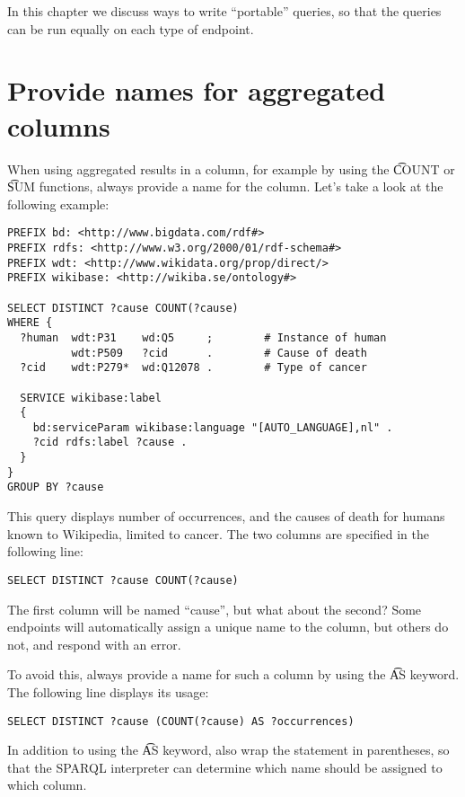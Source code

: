   In this chapter we discuss ways to write ``portable'' queries, so that
  the queries can be run equally on each type of endpoint.

\section{Provide names for aggregated columns}

  When using aggregated results in a column, for example by using the
  \t{COUNT} or \t{SUM} functions, always provide a name for
  the column.  Let's take a look at the following example:

\begin{lstlisting}[language=SPARQL]
PREFIX bd: <http://www.bigdata.com/rdf#>
PREFIX rdfs: <http://www.w3.org/2000/01/rdf-schema#>
PREFIX wdt: <http://www.wikidata.org/prop/direct/>
PREFIX wikibase: <http://wikiba.se/ontology#>

SELECT DISTINCT ?cause COUNT(?cause)
WHERE {
  ?human  wdt:P31    wd:Q5     ;        # Instance of human
          wdt:P509   ?cid      .        # Cause of death
  ?cid    wdt:P279*  wd:Q12078 .        # Type of cancer

  SERVICE wikibase:label
  {
    bd:serviceParam wikibase:language "[AUTO_LANGUAGE],nl" .
    ?cid rdfs:label ?cause .
  }
}
GROUP BY ?cause
\end{lstlisting}

  This query displays number of occurrences, and the causes of
  death for humans known to Wikipedia, limited to cancer.  The two
  columns are specified in the following line:

\begin{lstlisting}[language=SPARQL]
SELECT DISTINCT ?cause COUNT(?cause)
\end{lstlisting}

  The first column will be named ``cause'', but what about the second?
  Some endpoints will automatically assign a unique name to the column,
  but others do not, and respond with an error.

  To avoid this, always provide a name for such a column by using the
  \t{AS} keyword.  The following line displays its usage:

\begin{lstlisting}[language=SPARQL]
SELECT DISTINCT ?cause (COUNT(?cause) AS ?occurrences)
\end{lstlisting}

  In addition to using the \t{AS} keyword, also wrap the statement in
  parentheses, so that the SPARQL interpreter can determine which name
  should be assigned to which column.

